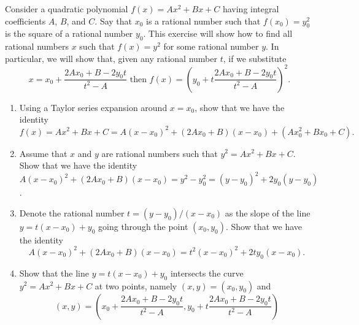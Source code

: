 \documentclass[12 pt, letterpaper]{hmcpset}
\begin{document}
\begin{problem}[1]
	Consider a quadratic polynomial $f(x) = Ax^{2} + Bx + C$ having integral coefficients $A$, $B$, and $C$. Say that  $x_{0}$ is a rational number such that $f(x_{0}) = y_{0}^{2}$ is the square of a rational number $y_{0}$. This exercise will show how to find all rational numbers $x$ such that $f(x) = y^{2}$ for some rational number $y$. In particular, we will show that, given any rational number $t$, if we substitute
	\[
		x = x_{0} + \frac{2 A x_{0} + B - 2 y_{0} t}{t^{2} - A} \text{ then } f(x) = \left ( y_{0} + t \frac{2 A x_{0} + B - 2 y_{0} t}{t^{2} - A} \right )^{2}.
	\]
	\begin{enumerate}
		\item Using a Taylor series expansion around $x = x_{0}$, show that we have the identity
			\[
				f(x) = A x^{2} + B x + C = A(x - x_{0})^{2} + (2 A x_{0} + B)(x - x_{0}) + (A x_{0}^{2} + B x_{0} + C).
			\]
		\item Assume that $x$ and $y$ are rational numbers such that $y^{2} = A x^{2} + B x + C$. Show that we have the identity $A(x - x_{0})^{2} + (2 A x_{0} + B)(x - x_{0}) = y^{2} - y_{0}^{2} = (y - y_{0})^{2} + 2 y_{0}(y - y_{0})$.
		\item Denote the rational number $t = (y - y_{0})/(x - x_{0})$ as the slope of the line $y = t (x - x_{0}) + y_{0}$ going through the point $(x_{0}, y_{0})$. Show that we have the identity
			\[
				A(x - x_{0})^{2} + (2 A x_{0} + B)(x - x_{0}) = t^{2}(x - x_{0})^{2} + 2 t y_{0} (x - x_{0}).
			\]
		\item Show that the line $y = t(x - x_{0}) + y_{0}$ intersects the curve $y^{2} = A x^{2} + B x + C$ at two points, namely $(x, y) = (x_{0}, y_{0})$ and
			\[
				(x, y) = \left (  x_{0} + \frac{2 A x_{0} + B - 2 y_{0} t}{t^{2} - A}, y_{0} + t \frac{2 A x_{0} + B - 2 y_{0} t}{t^{2} - A} \right )
			\]
	\end{enumerate}
\end{problem}
\end{document}
